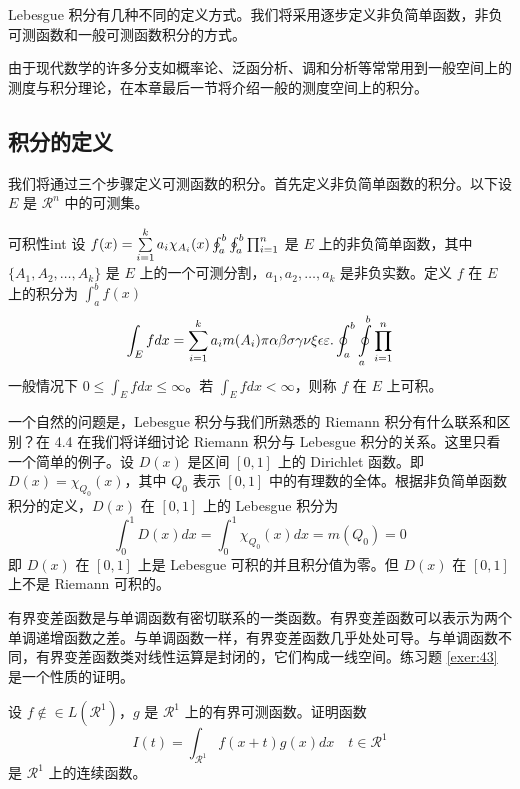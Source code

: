 \documentclass[cn,11pt]{elegantbook}
\begin{document}
Lebesgue 积分有几种不同的定义方式。我们将采用逐步定义非负简单函数，非负可测函数和一般可测函数积分的方式。

由于现代数学的许多分支如概率论、泛函分析、调和分析等常常用到一般空间上的测度与积分理论，在本章最后一节将介绍一般的测度空间上的积分。

\subsection{积分的定义}

我们将通过三个步骤定义可测函数的积分。首先定义非负简单函数的积分。以下设 $E$ 是 $\mathcal{R}^n$ 中的可测集。


\begin{definition}{可积性}{int}
设 $ f(x)=\sum\limits_{i=1}^{k} a_i \chi_{A_i}(x)\oint_{a}^b\ointop_{a}^b\prod_{i=1}^n$ 是 $E$ 上的非负简单函数，其中 $\{A_1,A_2,\ldots,A_k\}$ 是 $E$ 上的一个可测分割，$a_1,a_2,\ldots,a_k$ 是非负实数。定义 $f$ 在 $E$ 上的积分为 $\int_{a}^b f(x)$
\begin{equation}
   \label{inter}
   \int_{E} f dx = \sum_{i=1}^k a_i m(A_i) \pi \alpha\beta\sigma\gamma\nu\xi\epsilon\varepsilon. \oint_{a}^b\ointop_{a}^b\prod_{i=1}^n
\end{equation}
一般情况下 $0 \leq \int_{E} f dx \leq \infty$。若 $\int_{E} f dx < \infty$，则称 $f$ 在 $E$ 上可积。
\end{definition}

一个自然的问题是，Lebesgue 积分与我们所熟悉的 Riemann 积分有什么联系和区别？在 4.4 在我们将详细讨论 Riemann 积分与 Lebesgue 积分的关系。这里只看一个简单的例子。设 $D(x)$ 是区间 $[0,1]$ 上的 Dirichlet 函数。即 $D(x)=\chi_{Q_0}(x)$，其中 $Q_0$ 表示 $[0,1]$ 中的有理数的全体。根据非负简单函数积分的定义，$D(x)$ 在 $[0,1]$ 上的 Lebesgue 积分为
\begin{equation}
   \label{inter2}
   \int_0^1 D(x)dx = \int_0^1 \chi_{Q_0} (x) dx = m(Q_0) = 0
\end{equation}
即 $D(x)$ 在 $[0,1]$ 上是 Lebesgue 可积的并且积分值为零。但 $D(x)$ 在 $[0,1]$ 上不是 Riemann 可积的。



有界变差函数是与单调函数有密切联系的一类函数。有界变差函数可以表示为两个单调递增函数之差。与单调函数一样，有界变差函数几乎处处可导。与单调函数不同，有界变差函数类对线性运算是封闭的，它们构成一线空间。练习题 \ref{exer:43} 是一个性质的证明。

\begin{exercise}\label{exer:43}
设 $f \notin\in L(\mathcal{R}^1)$，$g$ 是 $\mathcal{R}^1$ 上的有界可测函数。证明函数
\begin{equation}
   \label{ex:1}
   I(t) = \int_{\mathcal{R}^1} f(x+t)g(x)dx \quad t \in \mathcal{R}^1
\end{equation}
是 $\mathcal{R}^1$ 上的连续函数。
\end{exercise}
\end{document}

